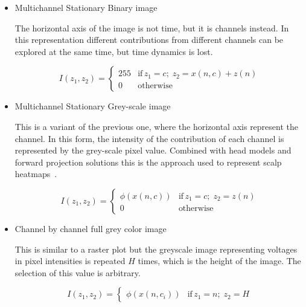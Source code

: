 \begin{itemize}
\item Multichannel Stationary Binary image

The horizontal axis of the image is not time, but it is channels instead.   In this representation different contributions from different channels can be explored at the same time, but time dynamics is lost.  

\begin{equation}
I(z_1,z_2) = \left\{ \begin{array}{rl}
255 & \text{if} \,  z_1 = c; \; z_2 =  x(n,c) + z(n) \\
0   & \mbox{otherwise}
\end{array}\right.
\label{eq:images}
\end{equation}

\item Multichannel Stationary Grey-scale image

This is a variant of the previous one, where the horizontal axis represent the channel.   In this form, the intensity of the contribution of each channel is represented by the grey-scale pixel value.  Combined with head models and forward projection solutions this is the approach used to represent scalp heatmaps~\cite{Gramfort2013}.

\begin{equation}
I(z_1,z_2) = \left\{ \begin{array}{rl}
\phi(x(n,c)) & \text{if} \,  z_1 = c; \; z_2 =  z(n) \\
0   & \mbox{otherwise}
\end{array}\right.
\label{eq:images}
\end{equation}


\item Channel by channel full grey color image

This is similar to a raster plot but the greyscale image representing voltages in pixel intensities is repeated $H$ times, which is the height of the image.  The selection of this value is arbitrary.

\begin{equation}
I(z_1,z_2) = \left\{ \begin{array}{rl} \phi(x(n,c_i))  & \text{if} \,  z_1 = n; \; z_2 = H \end{array}\right.
\label{eq:images}
\end{equation}


\end{itemize}

